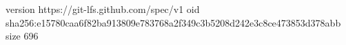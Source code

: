 version https://git-lfs.github.com/spec/v1
oid sha256:e15780caa6f82ba913809e783768a2f349c3b5208d242e3c8ce473853d378abb
size 696
